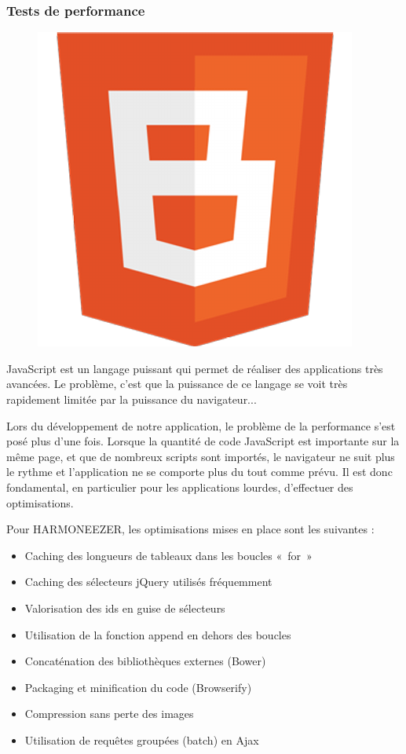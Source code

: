 \documentclass[a4paper,12pt]{article}
\begin{document}
\subsubsection{Tests de performance}

\begin{figure}[!h]
  \begin{center}
    \includegraphics[scale=0.2]{logo-benchmarkjs.png}
  \end{center}
\end{figure}

JavaScript est un langage puissant qui permet de réaliser des applications très avancées. Le problème, c'est que la puissance de ce langage se voit très rapidement limitée par la puissance du navigateur...

Lors du développement de notre application, le problème de la performance s'est posé plus d'une fois. Lorsque la quantité de code JavaScript est importante sur la même page, et que de nombreux scripts sont importés, le navigateur ne suit plus le rythme et l'application ne se comporte plus du tout comme prévu. Il est donc fondamental, en particulier pour les applications lourdes, d'effectuer des optimisations.

Pour HARMONEEZER, les optimisations mises en place sont les suivantes :

\begin{itemize}
 \item{Caching des longueurs de tableaux dans les boucles «~for~»}
 \item{Caching des sélecteurs jQuery utilisés fréquemment}
 \item{Valorisation des ids en guise de sélecteurs}
 \item{Utilisation de la fonction append en dehors des boucles}
 \item{Concaténation des bibliothèques externes (Bower)}
 \item{Packaging et minification du code (Browserify)}
 \item{Compression sans perte des images}
 \item{Utilisation de requêtes groupées (batch) en Ajax}
\end{itemize}
\end{document}
